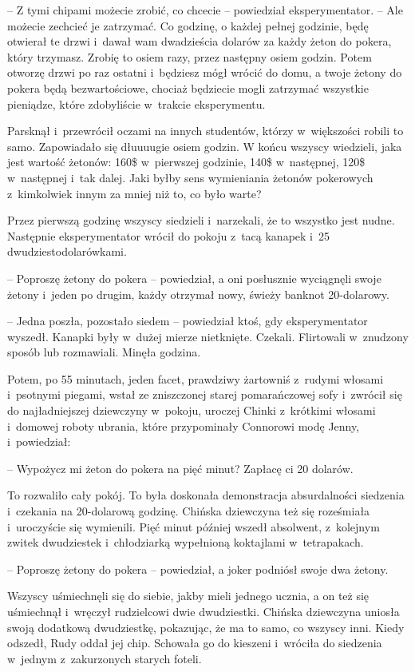 \documentclass[oneside,polish,11pt,rmheadings]{mwbk}
\begin{document}
-- Z tymi chipami możecie zrobić, co chcecie -- powiedział eksperymentator. -- Ale możecie zechcieć je zatrzymać. Co godzinę, o każdej pełnej godzinie, będę otwierał te drzwi i~dawał wam dwadzieścia dolarów za każdy żeton do pokera, który trzymasz. Zrobię to osiem razy, przez następny osiem godzin. Potem otworzę drzwi po raz ostatni i~będziesz mógł wrócić do domu, a twoje żetony do pokera będą bezwartościowe, chociaż będziecie mogli zatrzymać wszystkie pieniądze, które zdobyliście w~trakcie eksperymentu.

Parsknął i~przewrócił oczami na innych studentów, którzy w~większości robili to samo. Zapowiadało się dłuuuugie osiem godzin. W końcu wszyscy wiedzieli, jaka jest wartość żetonów: 160\$ w~pierwszej godzinie, 140\$ w~następnej, 120\$ w~następnej i~tak dalej. Jaki byłby sens wymieniania żetonów pokerowych z~kimkolwiek innym za mniej niż to, co było warte?

Przez pierwszą godzinę wszyscy siedzieli i~narzekali, że to wszystko jest nudne. Następnie eksperymentator wrócił do pokoju z~tacą kanapek i~25 dwudziestodolarówkami. 

-- Poproszę żetony do pokera -- powiedział, a oni posłusznie wyciągnęli swoje żetony i~jeden po drugim, każdy otrzymał nowy, świeży banknot 20-dolarowy.

-- Jedna poszła, pozostało siedem -- powiedział ktoś, gdy eksperymentator wyszedł. Kanapki były w~dużej mierze nietknięte. Czekali. Flirtowali w~znudzony sposób lub rozmawiali. Minęła godzina.

Potem, po 55 minutach, jeden facet, prawdziwy żartowniś z~rudymi włosami i~psotnymi piegami, wstał ze zniszczonej starej pomarańczowej sofy i~zwrócił się do najładniejszej dziewczyny w~pokoju, uroczej Chinki z~krótkimi włosami i~domowej roboty ubrania, które przypominały Connorowi modę Jenny, i~powiedział: 

-- Wypożycz mi żeton do pokera na pięć minut? Zapłacę ci 20 dolarów.

To rozwaliło cały pokój. To była doskonała demonstracja absurdalności siedzenia i~czekania na 20-dolarową godzinę. Chińska dziewczyna też się roześmiała i~uroczyście się wymienili. Pięć minut później wszedł absolwent, z~kolejnym zwitek dwudziestek i~chłodziarką wypełnioną koktajlami w~tetrapakach. 

-- Poproszę żetony do pokera -- powiedział, a joker podniósł swoje dwa żetony. 

Wszyscy uśmiechnęli się do siebie, jakby mieli jednego ucznia, a on też się uśmiechnął i~wręczył rudzielcowi dwie dwudziestki. Chińska dziewczyna uniosła swoją dodatkową dwudziestkę, pokazując, że ma to samo, co wszyscy inni. Kiedy odszedł, Rudy oddał jej chip. Schowała go do kieszeni i~wróciła do siedzenia w~jednym z~zakurzonych starych foteli.
\end{document}
